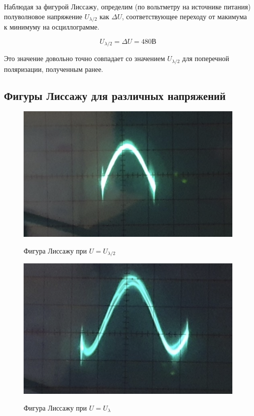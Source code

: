 \documentclass[11pt]{article}
\begin{document}
Наблюдая за фигурой Лиссажу, определим (по вольтметру на источнике питания) полуволновое напряжение 
\(U_{\lambda/2}\) как \(\Delta U\), соответствующее переходу от макимума к минимуму на осциллограмме.

\[ U_{\lambda/2} = \Delta U = 480 В\]

Это значение довольно точно совпадает со значением \(U_{\lambda/2}\) для поперечной поляризации, полученным ранее.



\subsection*{Фигуры Лиссажу для различных напряжений}

\begin{figure}[H]
  \centering
  \includegraphics[width=\textwidth]{L1.png}\label{fig:L1}
  \caption{Фигура Лиссажу при \(U = U_{\lambda/2}\)}
\end{figure}

\begin{figure}[H]
  \centering
  \includegraphics[width=\textwidth]{L2.png}\label{fig:L2}
  \caption{Фигура Лиссажу при \(U = U_{\lambda}\)}
\end{figure}
\end{document}
